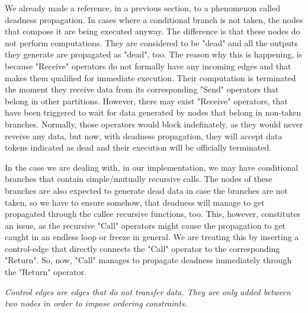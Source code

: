 \documentclass[ack,preface]{dithesis}
\begin{document}
We already made a reference, in a previous section, to a phenomenon called deadness propagation. In cases where a conditional branch is not taken, the nodes that compose it are being executed anyway. The difference is that these nodes do not perform computations. They are considered to be "dead" and all the outputs they generate are propagated as "dead", too. 
The reason why this is happening, is  because "Receive" operators do not formally have any incoming edges and that makes them qualified for immediate execution. Their computation is terminated the moment they receive data from its corresponding "Send" operators that belong in other partitions. However, there may exist "Receive" operators, that have been triggered to wait for data generated by nodes that belong in non-taken branches. Normally, those operators would block indefinately, as they would never reveive any data, but now, with deadness propagation, they will accept data tokens indicated as dead and their execution will be officially terminated.

In the case we are dealing with, in our implementation, we may have conditional branches that contain simple/mutually recursive calls. The nodes of these branches are  also expected to generate dead data in case the branches are not taken, so we have to ensure somehow, that deadness will manage to get propagated through the callee recursive functions, too. This, however, constitutes an issue, as the recursive "Call" operators might cause the propagation to get caught in an endless loop or freeze in general. We are treating this by inserting a control-edge that directly connects  the "Call" operator to the corresponding "Return". So, now, "Call" manages to propagate deadness immediately through the "Return" operator. 

\textit{Control edges are edges that do not transfer data. They are only added between two nodes in order to impose ordering constraints.}
\end{document}
